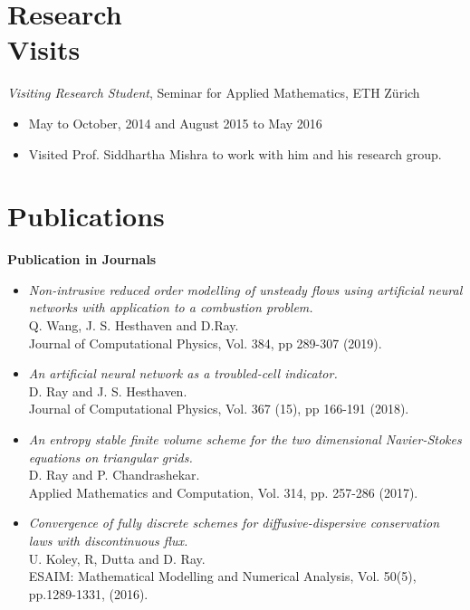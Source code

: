 \documentclass[margin]{res}
\begin{document}
\begin{resume}
\section{Research \\ Visits}
 {\it Visiting Research Student}, Seminar for Applied Mathematics, ETH Z\"{u}rich
 \begin{itemize} \itemsep -2pt  %
 \item May to October, 2014 and August 2015 to May 2016            
 \item Visited Prof. Siddhartha Mishra to work with him and his research group.
 \end{itemize}
 
 \newpage

 \section{Publications}

\textbf{Publication in Journals}                
            \begin{itemize}            
            
            \item {\it Non-intrusive reduced order modelling of unsteady flows using artificial neural networks with application to a combustion problem.} \\
              Q. Wang, J. S. Hesthaven and D.Ray.\\
              Journal of Computational Physics, Vol. 384, pp 289-307 (2019).
            
           \item {\it An artificial neural network as a troubled-cell indicator.}\\
            D. Ray and J. S. Hesthaven.\\
            Journal of Computational Physics, Vol. 367 (15), pp 166-191 (2018).

            \item {\it An entropy stable finite volume scheme for the two dimensional Navier-Stokes equations on triangular grids.}\\
            D. Ray and P. Chandrashekar.\\
             Applied Mathematics and Computation, Vol. 314, pp. 257-286 (2017).

             \item {\it Convergence of fully discrete schemes for diffusive-dispersive conservation laws with discontinuous flux.}\\
              U. Koley, R, Dutta and D. Ray. \\
              ESAIM: Mathematical Modelling and Numerical Analysis, Vol. 50(5), pp.1289-1331, (2016).
              

\end{itemize}
\end{resume}
\end{document}

